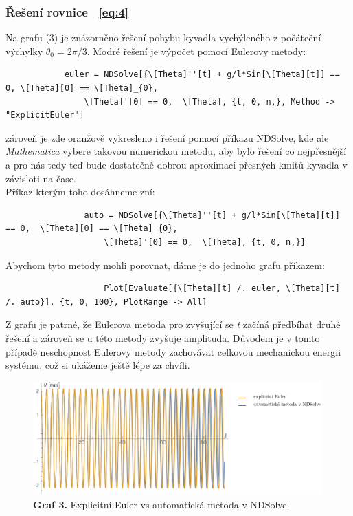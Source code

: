 \documentclass[reqno, a4paper]{amsart}
\begin{document}
		\subsubsection{Řešení rovnice ~\eqref{eq:4}}Na grafu (3) je znázorněno řešení pohybu kyvadla vychýleného z počáteční výchylky $\theta_{0}=2\pi/3$. Modré řešení je výpočet pomocí Eulerovy metody: 
		\begin{verbatim}
			euler = NDSolve[{\[Theta]''[t] + g/l*Sin[\[Theta][t]] == 0, \[Theta][0] == \[Theta]_{0}, 
				\[Theta]'[0] == 0,  \[Theta], {t, 0, n,}, Method -> "ExplicitEuler"]
			\end{verbatim}
			zároveň je zde oranžově vykresleno i řešení pomocí příkazu NDSolve, kde ale \textit{Mathematica} vybere takovou numerickou metodu, aby bylo řešení co nejpřesnější a pro nás tedy teď bude dostatečně dobrou aproximací přesných kmitů kyvadla v závisloti na čase. 
			\\
			Příkaz kterým toho dosáhneme zní:
			\begin{verbatim}
				auto = NDSolve[{\[Theta]''[t] + g/l*Sin[\[Theta][t]] == 0, 	\[Theta][0] == \[Theta]_{0}, 
					\[Theta]'[0] == 0,  \[Theta], {t, 0, n,}]
				\end{verbatim}	
				Abychom tyto metody mohli porovnat, dáme je do jednoho grafu příkazem:
				\begin{verbatim}
					Plot[Evaluate[{\[Theta][t] /. euler, \[Theta][t] /. auto}], {t, 0, 100}, PlotRange -> All]
				\end{verbatim}	
				Z grafu je patrné, že Eulerova metoda pro zvyšující se \textit{t} začíná předbíhat druhé řešení a zároveň se u  této metody zvyšuje amplituda. Důvodem je v tomto případě neschopnost Eulerovy metody zachovávat celkovou mechanickou energii systému, což si ukážeme ještě lépe za chvíli.
				\begin{figure}[h]
					\centering
					\includegraphics[width=0.99\textwidth]{vs}
					\caption*{\textbf{Graf 3.} Explicitní Euler vs automatická metoda v NDSolve.}  
				\end{figure}
				\\
				\\
\end{document}

